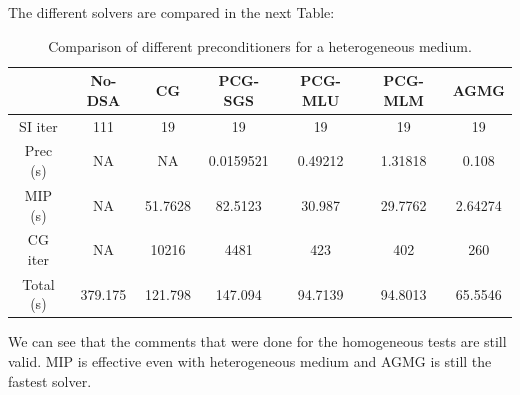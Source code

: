 The different solvers are compared in the next Table:
\begin{table}[H]
\begin{center}
\caption{Comparison of different preconditioners for a heterogeneous medium.}
\begin{tabular}{|c|c|c|c|c|c|c|}
\hline
 & No-DSA & CG & PCG-SGS & PCG-MLU & PCG-MLM & AGMG\\
\hline
  SI iter & 111     & 19      & 19        & 19      & 19      & 19 \\
 Prec (s) & NA      & NA      & 0.0159521 & 0.49212 & 1.31818 & 0.108 \\
  MIP (s) & NA      & 51.7628 & 82.5123   & 30.987  & 29.7762 & 2.64274 \\
  CG iter & NA      & 10216   & 4481      & 423     & 402     & 260 \\
Total (s) & 379.175 & 121.798 & 147.094   & 94.7139 & 94.8013 & 65.5546 \\
\hline
\end{tabular}
\end{center}
\end{table}
We can see that the comments that were done for the homogeneous tests are
still valid. MIP is effective even with heterogeneous medium and AGMG is
still the fastest solver.
